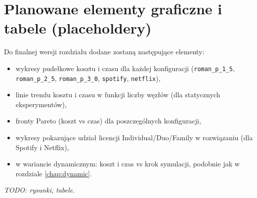 \section{Planowane elementy graficzne i tabele (placeholdery)}

Do finalnej wersji rozdziału dodane zostaną następujące elementy:

\begin{itemize}
\item wykresy pudełkowe kosztu i czasu dla każdej konfiguracji (\texttt{roman\_p\_1\_5}, \texttt{roman\_p\_2\_5}, \texttt{roman\_p\_3\_0}, \texttt{spotify}, \texttt{netflix}),
\item linie trendu kosztu i czasu w funkcji liczby węzłów (dla statycznych eksperymentów),
\item fronty Pareto (koszt vs czas) dla poszczególnych konfiguracji,
\item wykresy pokazujące udział licencji Individual/Duo/Family w rozwiązaniu (dla Spotify i Netflix),
\item w wariancie dynamicznym: koszt i czas vs krok symulacji, podobnie jak w rozdziale \ref{chap:dynamic}.
\end{itemize}

\emph{TODO: rysunki, tabele.}
